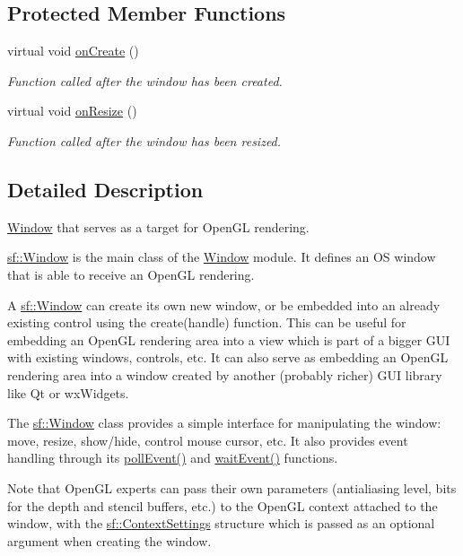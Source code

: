 \subsection*{Protected Member Functions}
\begin{DoxyCompactItemize}
\item 
virtual void \hyperlink{classsf_1_1Window_a106633b9be49b27f83d4712689b493eb}{on\-Create} ()
\begin{DoxyCompactList}\small\item\em Function called after the window has been created. \end{DoxyCompactList}\item 
virtual void \hyperlink{classsf_1_1Window_a10f567a387da7b49f417f73321fcf64d}{on\-Resize} ()
\begin{DoxyCompactList}\small\item\em Function called after the window has been resized. \end{DoxyCompactList}\end{DoxyCompactItemize}


\subsection{Detailed Description}
\hyperlink{classsf_1_1Window}{Window} that serves as a target for Open\-G\-L rendering. 

\hyperlink{classsf_1_1Window}{sf\-::\-Window} is the main class of the \hyperlink{classsf_1_1Window}{Window} module. It defines an O\-S window that is able to receive an Open\-G\-L rendering.

A \hyperlink{classsf_1_1Window}{sf\-::\-Window} can create its own new window, or be embedded into an already existing control using the create(handle) function. This can be useful for embedding an Open\-G\-L rendering area into a view which is part of a bigger G\-U\-I with existing windows, controls, etc. It can also serve as embedding an Open\-G\-L rendering area into a window created by another (probably richer) G\-U\-I library like Qt or wx\-Widgets.

The \hyperlink{classsf_1_1Window}{sf\-::\-Window} class provides a simple interface for manipulating the window\-: move, resize, show/hide, control mouse cursor, etc. It also provides event handling through its \hyperlink{classsf_1_1Window_a338e996585faf82e93069858e3b531b7}{poll\-Event()} and \hyperlink{classsf_1_1Window_aaf02ab64fbc1d374eef3696df54137bc}{wait\-Event()} functions.

Note that Open\-G\-L experts can pass their own parameters (antialiasing level, bits for the depth and stencil buffers, etc.) to the Open\-G\-L context attached to the window, with the \hyperlink{structsf_1_1ContextSettings}{sf\-::\-Context\-Settings} structure which is passed as an optional argument when creating the window.

